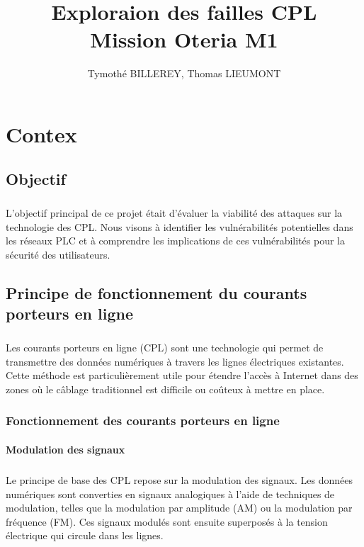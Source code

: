 \documentclass[a4paper,twocolumn]{report}
\title{\Huge{Exploraion des failles CPL}\\Mission Oteria M1}
\author{Tymothé BILLEREY, Thomas LIEUMONT}
\date{}
\begin{document}
\maketitle
\newpage %
\newpage
{}
\tableofcontents
\pagebreak

\chapter{Contex}

\section{Objectif}
\paragraph{} L'objectif principal de ce projet était d'évaluer la viabilité des attaques sur la technologie des CPL. Nous visons à identifier les vulnérabilités potentielles dans les réseaux PLC et à comprendre les implications de ces vulnérabilités pour la sécurité des utilisateurs.

\section{Principe de fonctionnement du courants porteurs en ligne}
\paragraph{} Les courants porteurs en ligne (CPL) sont une technologie qui permet de transmettre des données numériques à travers les lignes électriques existantes. Cette méthode est particulièrement utile pour étendre l'accès à Internet dans des zones où le câblage traditionnel est difficile ou coûteux à mettre en place.

\subsection{Fonctionnement des courants porteurs en ligne}

\subsubsection{Modulation des signaux}
\paragraph{} Le principe de base des CPL repose sur la modulation des signaux. Les données numériques sont converties en signaux analogiques à l'aide de techniques de modulation, telles que la modulation par amplitude (AM) ou la modulation par fréquence (FM). Ces signaux modulés sont ensuite superposés à la tension électrique qui circule dans les lignes.
\end{document}

